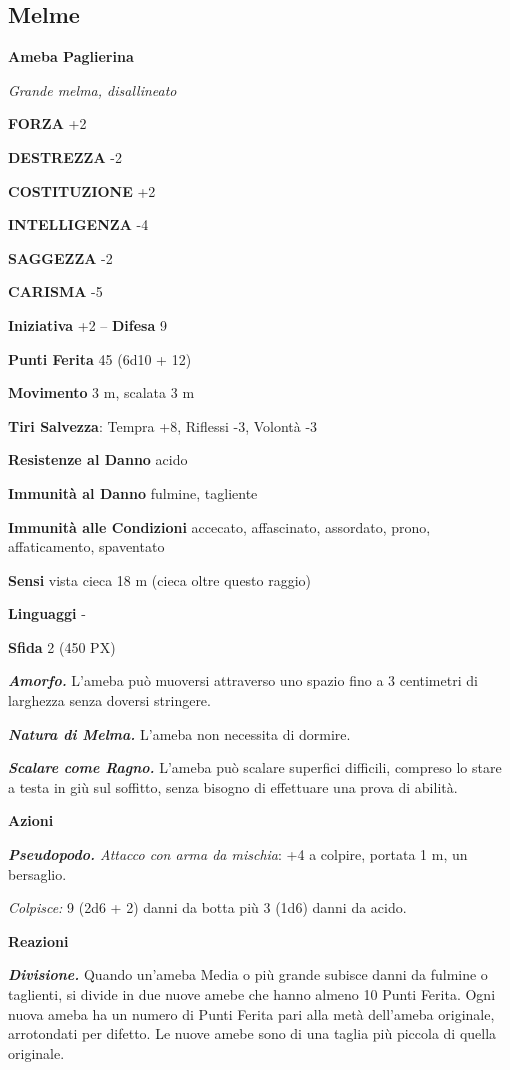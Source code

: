 \begin{multicols}{2}
	\subsection{Melme}

	\medskip{}\textbf{Ameba Paglierina}

	\textit{Grande melma, disallineato}

	\textbf{FORZA} +2

	\textbf{DESTREZZA} -2

	\textbf{COSTITUZIONE} +2

	\textbf{INTELLIGENZA} -4

	\textbf{SAGGEZZA} -2

	\textbf{CARISMA} -5

	\textbf{Iniziativa} +2 -- \textbf{Difesa} 9

	\textbf{Punti Ferita} 45 (6d10 + 12)

	\textbf{Movimento} 3 m, scalata 3 m

	\textbf{Tiri Salvezza}: Tempra +8, Riflessi -3, Volontà -3

	\textbf{Resistenze al Danno} acido

	\textbf{Immunità al Danno} fulmine, tagliente

	\textbf{Immunità alle Condizioni} accecato, affascinato, assordato, prono, affaticamento, spaventato

	\textbf{Sensi} vista cieca 18 m (cieca oltre questo raggio)

	\textbf{Linguaggi} -

	\textbf{Sfida} 2 (450 PX)

	\textit{\textbf{Amorfo.}} L'ameba può muoversi attraverso uno spazio fino a 3 centimetri di larghezza senza doversi stringere.

	\textit{\textbf{Natura di Melma.}} L'ameba non necessita di dormire.

	\textit{\textbf{Scalare come Ragno.}} L'ameba può scalare superfici difficili, compreso lo stare a testa in giù sul soffitto, senza bisogno di effettuare una prova di abilità.

	\textbf{Azioni}

	\textit{\textbf{Pseudopodo.} Attacco con arma da mischia}: +4 a colpire, portata 1 m, un bersaglio.

	\textit{Colpisce:} 9 (2d6 + 2) danni da botta più 3 (1d6) danni da acido.

	\textbf{Reazioni}

	\textit{\textbf{Divisione.}} Quando un'ameba Media o più grande subisce danni da fulmine o taglienti, si divide in due nuove amebe che hanno almeno 10 Punti Ferita. Ogni nuova ameba ha un numero di Punti Ferita pari alla metà dell'ameba originale, arrotondati per difetto. Le nuove amebe sono di una taglia più piccola di quella originale.


\end{multicols}
